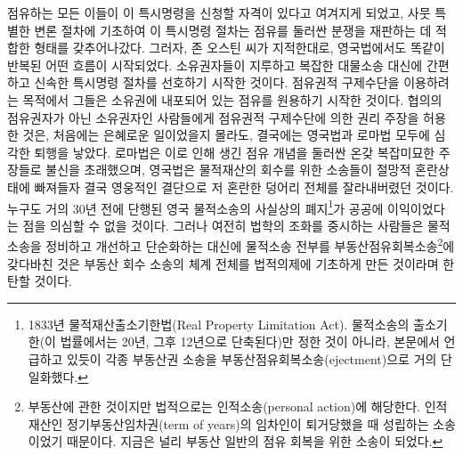 점유하는 모든 이들이 이 특시명령을 신청할 자격이 있다고
여겨지게 되었고,
사뭇 특별한 변론 절차에 기초하여
이 특시명령 절차는 점유를 둘러싼 분쟁을 재판하는 데 적합한 형태를
갖추어나갔다.
그러자, 존 오스틴 씨가 지적한대로,
영국법에서도 똑같이 반복된 어떤 흐름이 시작되었다.
소유권자들이
지루하고 복잡한 대물소송 대신에
간편하고 신속한 특시명령 절차를 선호하기 시작한 것이다.
점유권적 구제수단을 이용하려는 목적에서
그들은 소유권에 내포되어 있는 점유를 원용하기 시작한 것이다.
협의의 점유권자가 아닌 소유권자인 사람들에게
점유권적 구제수단에 의한 권리 주장을 허용한 것은,
처음에는 은혜로운 일이었을지 몰라도,
결국에는 영국법과 로마법 모두에 심각한 퇴행을 낳았다.
로마법은
이로 인해 생긴
점유 개념을 둘러싼 온갖 복잡미묘한 주장들로
불신을 초래했으며,
영국법은
물적재산의 회수를 위한 소송들이
절망적 혼란상태에 빠져들자
결국 영웅적인 결단으로
저 혼란한 덩어리 전체를 잘라내버렸던 것이다.
누구도 거의 30년 전에 단행된
영국 물적소송의 사실상의 폐지\footnote{%
  1833년 물적재산출소기한법(Real Property Limitation Act).
  물적소송의 출소기한(이 법률에서는 20년, 그후 12년으로 단축된다)만
  정한 것이 아니라, 본문에서 언급하고 있듯이
  각종 부동산권 소송을 부동산점유회복소송(ejectment)으로 거의 단일화했다.
}가 공공에 이익이었다는 점을 의심할 수 없을 것이다.
그러나 여전히
법학의 조화를 중시하는 사람들은
물적소송을
정비하고 개선하고 단순화하는 대신에
물적소송 전부를 부동산점유회복소송\footnote{%
  부동산에 관한 것이지만 법적으로는 인적소송(personal action)에
  해당한다. 인적재산인 정기부동산임차권(term of years)의 임차인이
  퇴거당했을 때 성립하는 소송이었기 때문이다.
  지금은 널리 부동산 일반의 점유 회복을 위한 소송이 되었다.
}에 갖다바친 것은
부동산 회수 소송의 체계 전체를 법적의제에 기초하게 만든 것이라며
한탄할 것이다.

